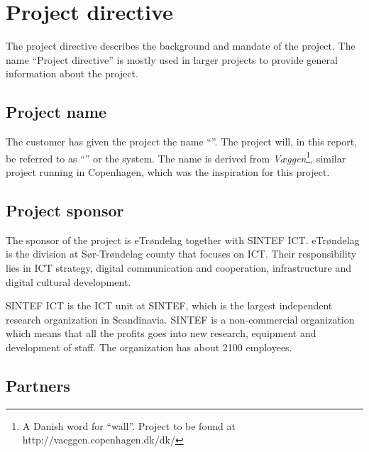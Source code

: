 \documentclass[11pt]{book}
\begin{document}
\section{Project directive}
The project directive describes the background and mandate of the project. The name ``Project directive'' is mostly used in larger projects to provide general information about the project.

\subsection{Project name}
The customer has given the project the name ``\fullprojectname''. The project will, in this report, be referred to as ``\shortprojectname'' or the system. The name is derived from \emph{Væggen}\footnote{A Danish word for ``wall''. Project to be found at http://vaeggen.copenhagen.dk/dk/}, similar project running in Copenhagen, which was the inspiration for this project.

\subsection{Project sponsor}
The sponsor of the project is eTrøndelag together with SINTEF ICT.
eTrøndelag is the division at Sør-Trøndelag county that focuses on ICT. Their responsibility lies in ICT strategy, digital communication and cooperation, infrastructure and digital cultural development.

SINTEF ICT is the ICT unit at SINTEF, which is the largest independent research organization in Scandinavia. SINTEF is a non-commercial organization which means that all the profits goes into new research, equipment and development of staff. The organization has about 2100 employees.

\subsection{Partners}
\end{document}
